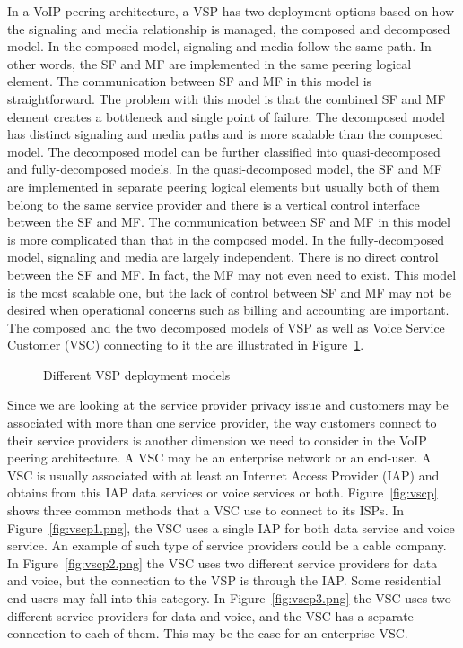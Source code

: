 \documentclass[letterpaper,notitlepage,times,12pt]{article}
\begin{document}
In a VoIP peering architecture, a VSP has two deployment options based on how the signaling and media relationship is managed, the composed and decomposed model. In the composed model, signaling and media follow the same path. In other words, the SF and MF are implemented in the same peering logical element. The communication between SF and MF in this model is straightforward. The problem with this model is that the combined SF and MF element creates a bottleneck and single point of failure. The decomposed model has distinct signaling and media paths and is more scalable than the composed model. The decomposed model can be further classified into quasi-decomposed and fully-decomposed models. In the quasi-decomposed model, the SF and MF are implemented in separate peering logical elements but usually both of them belong to the same service provider and there is a vertical control interface between the SF and MF. The communication between SF and MF in this model is more complicated than that in the composed model. In the fully-decomposed model, signaling and media are largely independent. There is no direct control between the SF and MF. In fact, the MF may not even need to exist. This model is the most scalable one, but the lack of control between SF and MF may not be desired when operational concerns such as billing and accounting are important. The composed and the two decomposed models of VSP as well as Voice Service Customer (VSC) connecting to it the are illustrated in Figure~\ref{fig:depmod}.

\begin{figure}[!thp]
\begin{center}
\end{center}
\caption{Different VSP deployment models}\label{fig:depmod}
\end{figure}



Since we are looking at the service provider privacy issue and customers may be associated with more than one service provider, the way customers connect to their service providers is another dimension we need to consider in the VoIP peering architecture. A VSC may be an enterprise network or an end-user. A VSC is usually associated with at least an Internet Access Provider (IAP) and obtains from this IAP data services or voice services or both. Figure~\ref{fig:vscp} shows three common methods that a VSC use to connect to its ISPs. In Figure~\ref{fig:vscp1.png}, the VSC uses a single IAP for both data service and voice service. An example of such type of service providers could be a cable company. In Figure~\ref{fig:vscp2.png} the VSC uses two different service providers for data and voice, but the connection to the VSP is through the IAP. Some residential end users may fall into this category. In Figure~\ref{fig:vscp3.png} the VSC uses two different service providers for data and voice, and the VSC has a separate connection to each of them. This may be the case for an enterprise VSC.
\end{document}
